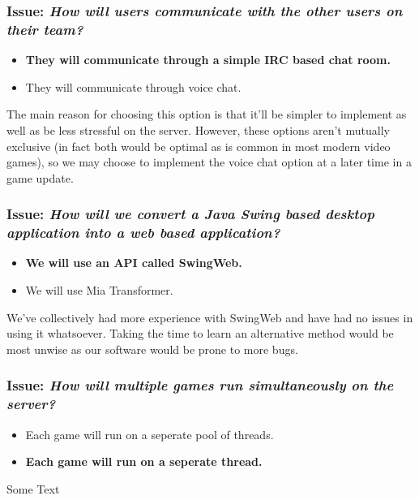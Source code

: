 \subsubsection*{Issue: \textit{How will users communicate with the other users on their team?}}

  \begin{itemize}
    \item \textbf{They will communicate through a simple IRC based chat room.}
    \item They will communicate through voice chat.
  \end{itemize}

The main reason for choosing this option is that it'll be simpler to implement as well as be less stressful on the server. However, these options aren't mutually exclusive (in fact both would be optimal as is common in most modern video games), so we may choose to implement the voice chat option at a later time in a game update.

\subsubsection*{Issue: \textit{How will we convert a Java Swing based desktop application into a web based application?}}

  \begin{itemize}
    \item \textbf{We will use an API called SwingWeb.}
    \item We will use Mia Transformer.
  \end{itemize}

We've collectively had more experience with SwingWeb and have had no issues in using it whatsoever. Taking the time to learn an alternative method would be most unwise as our software would be prone to more bugs.

\subsubsection*{Issue: \textit{How will multiple games run simultaneously on the server?}}

  \begin{itemize}
    \item Each game will run on a seperate pool of threads.
    \item \textbf{Each game will run on a seperate thread.}
  \end{itemize}

Some Text

